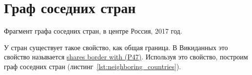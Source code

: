 




\newpage
\section{Граф соседних стран}
%
\begin{marginfigure}%
	{
		\setlength{\fboxsep}{0pt}%
		\setlength{\fboxrule}{1pt}%
	}
    \caption[Фрагмент графа соседних стран, 2017 год.]{Фрагмент графа соседних стран, в центре Россия, 2017 год.}
	\label{fig:neighboring_countries_2017}%
\end{marginfigure}


У стран существует такое свойство, как общая граница. 
В Викиданных это свойство называется 
\href{https://www.wikidata.org/wiki/Property:P47}{shares border with (P47)}. 
Используя это свойство, построим граф соседних стран (листинг~\ref{lst:neighboring_countries}).

